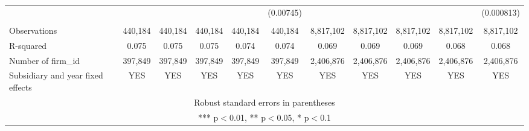 \begin{tabular}{lcccccccccc}
 &  &  &  &  & (0.00745) &  &  &  &  & (0.000813) \\
 &  &  &  &  &  &  &  &  &  &  \\
Observations & 440,184 & 440,184 & 440,184 & 440,184 & 440,184 & 8,817,102 & 8,817,102 & 8,817,102 & 8,817,102 & 8,817,102 \\
R-squared & 0.075 & 0.075 & 0.075 & 0.074 & 0.074 & 0.069 & 0.069 & 0.069 & 0.068 & 0.068 \\
Number of firm\_id & 397,849 & 397,849 & 397,849 & 397,849 & 397,849 & 2,406,876 & 2,406,876 & 2,406,876 & 2,406,876 & 2,406,876 \\
 Subsidiary and year fixed effects & YES & YES & YES & YES & YES & YES & YES & YES & YES & YES \\ \hline
\multicolumn{11}{c}{ Robust standard errors in parentheses} \\
\multicolumn{11}{c}{ *** p$<$0.01, ** p$<$0.05, * p$<$0.1} \\
\end{tabular}
